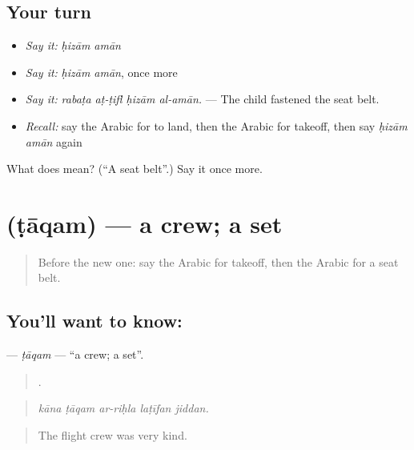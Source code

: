 \subsection*{Your turn}
\begin{itemize}
\raggedright
  \item \emph{Say it:} \emph{ḥizām amān}
  \item \emph{Say it:} \emph{ḥizām amān}, once more
  \item \emph{Say it:} \emph{rabaṭa aṭ-ṭifl ḥizām al-amān.} — The child fastened the seat belt.
  \item \emph{Recall:} say the Arabic for to land, then the Arabic for takeoff, then say \emph{ḥizām amān} again
\end{itemize}

\begin{tcolorbox}[breakable,colback=teal!4,colframe=teal!35!black,title={Before you move on}]
What does   mean? (\textquotedblleft{}A seat belt\textquotedblright{}.) Say it once more.
\end{tcolorbox}
\section[\texorpdfstring{\ar{طاقم} (ṭāqam)}{طاقم (ṭāqam)}]{ (ṭāqam) — a crew; a set}

\label{lesson:AR-C424-taqam}



\begin{quote}
Before the new one: say the Arabic for takeoff, then the Arabic for a seat belt.
\end{quote}

\subsection*{You'll want to know: }
\textbf{} — \emph{ṭāqam} — \textquotedblleft{}a crew; a set\textquotedblright{}.

\begin{quote}
    .
\end{quote}

\begin{quote}
\emph{kāna ṭāqam ar-riḥla laṭīfan jiddan.}
\end{quote}

\begin{quote}
The flight crew was very kind.
\end{quote}

